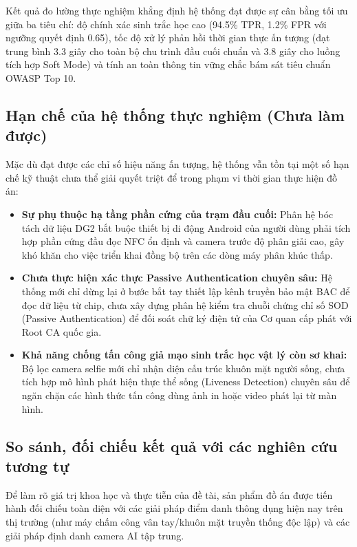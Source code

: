 ﻿\documentclass[../DoAn.tex]{subfiles}
\begin{document}
Kết quả đo lường thực nghiệm khẳng định hệ thống đạt được sự cân bằng tối ưu giữa ba tiêu chí: độ chính xác sinh trắc học cao (94.5\% TPR, 1.2\% FPR với ngưỡng quyết định 0.65), tốc độ xử lý phản hồi thời gian thực ấn tượng (đạt trung bình 3.3 giây cho toàn bộ chu trình đầu cuối chuẩn và 3.8 giây cho luồng tích hợp Soft Mode) và tính an toàn thông tin vững chắc bám sát tiêu chuẩn OWASP Top 10.

\subsection{Hạn chế của hệ thống thực nghiệm (Chưa làm được)}
Mặc dù đạt được các chỉ số hiệu năng ấn tượng, hệ thống vẫn tồn tại một số hạn chế kỹ thuật chưa thể giải quyết triệt để trong phạm vi thời gian thực hiện đồ án:
\begin{itemize}
    \item \textbf{Sự phụ thuộc hạ tầng phần cứng của trạm đầu cuối:} Phân hệ bóc tách dữ liệu DG2 bắt buộc thiết bị di động Android của người dùng phải tích hợp phần cứng đầu đọc NFC ổn định và camera trước độ phân giải cao, gây khó khăn cho việc triển khai đồng bộ trên các dòng máy phân khúc thấp.
    \item \textbf{Chưa thực hiện xác thực Passive Authentication chuyên sâu:} Hệ thống mới chỉ dừng lại ở bước bắt tay thiết lập kênh truyền bảo mật BAC để đọc dữ liệu từ chip, chưa xây dựng phân hệ kiểm tra chuỗi chứng chỉ số SOD (Passive Authentication) để đối soát chữ ký điện tử của Cơ quan cấp phát với Root CA quốc gia.
    \item \textbf{Khả năng chống tấn công giả mạo sinh trắc học vật lý còn sơ khai:} Bộ lọc camera selfie mới chỉ nhận diện cấu trúc khuôn mặt người sống, chưa tích hợp mô hình phát hiện thực thể sống (Liveness Detection) chuyên sâu để ngăn chặn các hình thức tấn công dùng ảnh in hoặc video phát lại từ màn hình.
\end{itemize}

\subsection{So sánh, đối chiếu kết quả với các nghiên cứu tương tự}
Để làm rõ giá trị khoa học và thực tiễn của đề tài, sản phẩm đồ án được tiến hành đối chiếu toàn diện với các giải pháp điểm danh thông dụng hiện nay trên thị trường (như máy chấm công vân tay/khuôn mặt truyền thống độc lập) và các giải pháp định danh camera AI tập trung.
\end{document}
